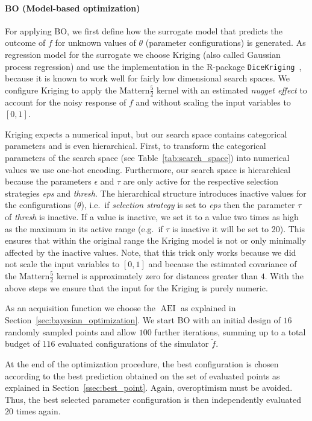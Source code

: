 \documentclass[bimj,fleqn]{w-art}
\theoremstyle{plain}
\theoremstyle{definition}
\begin{document}
\paragraph{BO (Model-based optimization)}
For applying BO, we first define how the surrogate model that predicts the outcome of $f$ for unknown values of $\theta$ (parameter configurations) is generated.
As regression model for the surrogate we choose Kriging (also called Gaussian process regression) and use the implementation in the R-package \texttt{DiceKriging}~\citep{roustant_dicekriging_2012}, because it is known to work well for fairly low dimensional search spaces.
We configure Kriging to apply the Mattern$\frac{5}{2}$ kernel with an estimated \emph{nugget effect} to account for the noisy response of $f$ and without scaling the input variables to $[0,1]$.

Kriging expects a numerical input, but our search space contains categorical parameters and is even hierarchical.
First, to transform the categorical parameters of the search space (see Table~\ref{tab:search_space}) into numerical values we use one-hot encoding.
Furthermore, our search space is hierarchical because the parameters $\epsilon$ and $\tau$ are only active for the respective selection strategies \emph{eps} and \emph{thresh}.
The hierarchical structure introduces inactive values for the configurations ($\theta$), i.e.\ if \emph{selection strategy} is set to \emph{eps} then the parameter $\tau$ of \emph{thresh} is inactive.
If a value is inactive, we set it to a value two times as high as the maximum in its active range (e.g.\ if $\tau$ is inactive it will be set to 20).
This ensures that within the original range the Kriging model is not or only minimally affected by the inactive values.
Note, that this trick only works because we did not scale the input variables to $[0,1]$ and because the estimated covariance of the Mattern$\frac{5}{2}$ kernel is approximately zero for distances greater than $4$.
With the above steps we ensure that the input for the Kriging is purely numeric.

As an acquisition function we choose the $\operatorname{AEI}$ as explained in Section~\ref{sec:bayesian_optimization}.
We start BO with an initial design of $16$ randomly sampled points and allow $100$ further iterations, summing up to a total budget of $116$ evaluated configurations of the simulator $\tilde{f}$.

At the end of the optimization procedure, the best configuration is chosen according to the best prediction obtained on the set of evaluated points as explained in Section~\ref{ssec:best_point}.
Again, overoptimism must be avoided. 
Thus, the best selected parameter configuration is then independently evaluated $20$ times again.
\end{document}
